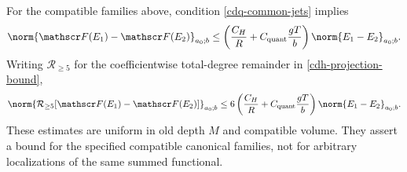 \begin{theorem}
\label{cdq-theorem}
For the compatible families above, condition
\eqref{cdq-common-jets} implies
\begin{equation}
 \norm{\mathscr F(E_1)-\mathscr F(E_2)}_{a_0;b}
 \le
 \left(\frac{C_H}{R}
             +C_{\mathrm{quant}}\frac{gT}{b}\right)
                       \norm{E_1-E_2}_{a_0;b}.
 \label{cdq-full-bound}
\end{equation}
Writing $\mathcal R_{\ge5}$ for the coefficientwise
total-degree remainder in \eqref{cdh-projection-bound},
\begin{equation}
 \norm{\mathcal R_{\ge5}
       [\mathscr F(E_1)-\mathscr F(E_2)]}_{a_0;b}
 \le6\left(\frac{C_H}{R}
             +C_{\mathrm{quant}}\frac{gT}{b}\right)
                       \norm{E_1-E_2}_{a_0;b}.
 \label{cdq-projected-bound}
\end{equation}
These estimates are uniform in old depth $M$ and compatible
volume. They assert a bound for the specified compatible
canonical families, not for arbitrary localizations of
the same summed functional.
\end{theorem}

